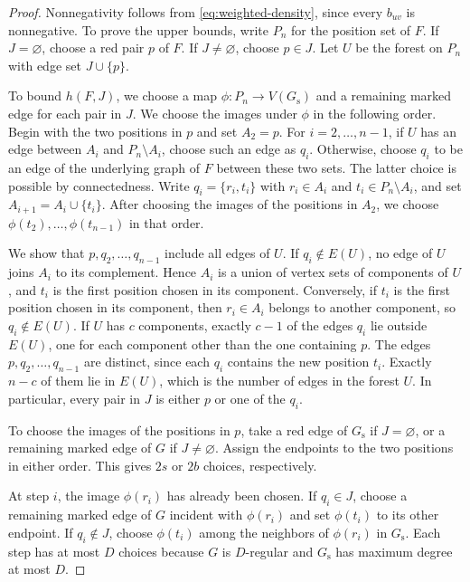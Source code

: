 \documentclass[preprint,11pt,numbers]{elsarticle-arxiv}
\numberwithin{equation}{section}
\theoremstyle{definition}
\begin{document}
\begin{proof}
Nonnegativity follows from \eqref{eq:weighted-density}, since
every $b_{uv}$ is nonnegative. To prove the upper bounds, write
$P_n$ for the position set of $F$. If $J=\varnothing$, choose a red
pair $p$ of $F$. If $J\ne\varnothing$, choose $p\in J$. Let $U$ be
the forest on $P_n$ with edge set $J\cup\{p\}$.

To bound $h(F,J)$, we choose a map $\phi\colon P_n\to V(G_{\mathrm s})$
and a remaining marked edge for each pair in $J$. We choose the
images under $\phi$ in the following order. Begin with the two
positions in $p$ and set $A_2=p$. For $i=2,\ldots,n-1$, if $U$ has
an edge between $A_i$ and $P_n\setminus A_i$, choose such an edge
as $q_i$. Otherwise, choose $q_i$ to be an edge of the underlying
graph of $F$ between these two sets. The latter choice is possible
by connectedness. Write $q_i=\{r_i,t_i\}$ with $r_i\in A_i$ and
$t_i\in P_n\setminus A_i$, and set $A_{i+1}=A_i\cup\{t_i\}$.
After choosing the images of the positions in $A_2$, we choose
$\phi(t_2),\ldots,\phi(t_{n-1})$ in that order.

We show that $p,q_2,\ldots,q_{n-1}$ include all edges of $U$.
If $q_i\notin E(U)$, no edge of $U$ joins $A_i$ to its complement.
Hence $A_i$ is a union of vertex sets of components of $U$, and
$t_i$ is the first position chosen in its component. Conversely,
if $t_i$ is the first position chosen in its component, then
$r_i\in A_i$ belongs to another component, so $q_i\notin E(U)$.
If $U$ has $c$ components, exactly $c-1$ of the edges $q_i$ lie
outside $E(U)$, one for each component other than the one containing $p$.
The edges $p,q_2,\ldots,q_{n-1}$ are distinct, since each $q_i$ contains
the new position $t_i$. Exactly $n-c$ of them lie in $E(U)$, which
is the number of edges in the forest $U$. In particular, every pair in
$J$ is either $p$ or one of the $q_i$.

To choose the images of the positions in $p$, take a red edge of
$G_{\mathrm s}$ if $J=\varnothing$, or a remaining marked edge of $G$
if $J\ne\varnothing$. Assign the endpoints to the two positions in
either order. This gives $2s$ or $2b$ choices, respectively.

At step $i$, the image $\phi(r_i)$ has already been chosen. If
$q_i\in J$, choose a remaining marked edge of $G$ incident with
$\phi(r_i)$ and set $\phi(t_i)$ to its other endpoint. If
$q_i\notin J$, choose $\phi(t_i)$ among the neighbors of $\phi(r_i)$
in $G_{\mathrm s}$. Each step has at most $D$ choices because $G$
is $D$-regular and $G_{\mathrm s}$ has maximum degree at most $D$.


\end{proof}
\end{document}
